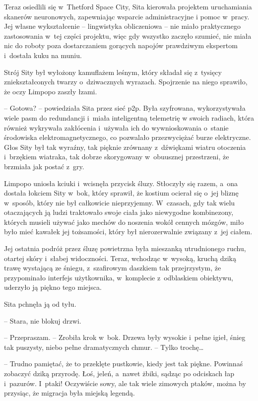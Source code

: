 \documentclass[oneside,polish,11pt,sfheadings]{mwbk}
\begin{document}
Teraz osiedlili się w~Thetford Space City, Sita kierowała projektem
uruchamiania skanerów neuronowych, zapewniając wsparcie administracyjne
i pomoc w~pracy. Jej własne wykształcenie -- lingwistyka obliczeniowa -- nie miało praktycznego zastosowania w~tej części projektu, więc gdy
wszystko zaczęło szumieć, nie miała nic do roboty poza dostarczaniem
gorących napojów prawdziwym ekspertom i~dostała kuku na muniu.

Strój Sity był wyłożony kamuflażem leśnym, który składał się z~tysięcy
zniekształconych twarzy o~dziwacznych wyrazach. Spojrzenie na niego
sprawiło, że oczy Limpopo zaszły łzami.

-- Gotowa? -- powiedziała Sita przez sieć p2p. Była szyfrowana,
wykorzystywała wiele pasm do redundancji i~miała inteligentną telemetrię
w swoich radiach, która również wykrywała zakłócenia i~używała ich do
wywnioskowania o~stanie środowiska elektromagnetycznego, co pozwalało
przezwyciężać burze elektryczne. Głos Sity był tak wyraźny, tak pięknie
zrównany z~dźwiękami wiatru otoczenia i~brzękiem wiatraka, tak dobrze
skorygowany w~obuusznej przestrzeni, że brzmiała jak postać z~gry.

Limpopo uniosła kciuki i~wcisnęła przycisk śluzy. Stłoczyły się razem, a~ona dostała łokciem Sity w~bok, który sprawił, że kostium ocierał się o~jej bliznę w~sposób, który nie był całkowicie nieprzyjemny. W~czasach,
gdy tak wielu otaczających ją ludzi traktowało swoje ciała jako
niewygodne kombinezony, których musieli używać jako mechów do noszenia
wokół cennych mózgów, miło było mieć kawałek jej tożsamości, który był
nierozerwalnie związany z~jej ciałem.

Jej ostatnia podróż przez śluzę powietrzna była mieszanką utrudnionego
ruchu, otartej skóry i~słabej widoczności. Teraz, wchodząc w~wysoką,
kruchą dziką trawę wystającą ze śniegu, z~szafirowym daszkiem tak
przejrzystym, że przypominało interfejs użytkownika, w~komplecie z~odblaskiem obiektywu, uderzyło ją piękno tego miejsca.

Sita pchnęła ją od tyłu. 

-- Stara, nie blokuj drzwi.

-- Przepraszam. -- Zrobiła krok w~bok. Drzewa były wysokie i~pełne igieł,
śnieg tak puszysty, niebo pełne dramatycznych chmur. -- Tylko trochę\ldots 

-- Trudno pamiętać, że to przeklęte pustkowie, kiedy jest tak piękne.
Powinnaś zobaczyć dziką przyrodę. Łoś, jeleń, a~nawet żbiki, sądząc po
odciskach łap i~pazurów. I~ptaki! Oczywiście sowy, ale tak wiele
zimowych ptaków, można by przysiąc, że migracja była miejską legendą.
\end{document}
